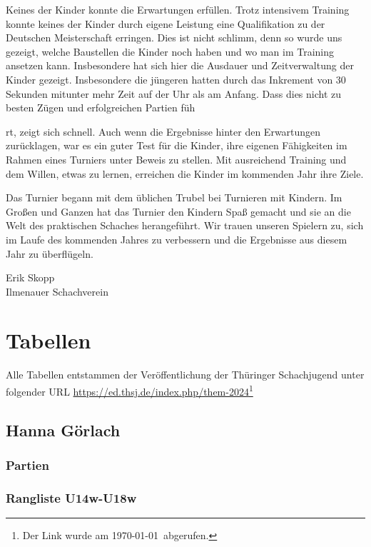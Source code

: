 \documentclass[a4paper,ngerman]{tui-algo-seminar}
\begin{document}
Keines der Kinder konnte die Erwartungen erfüllen. Trotz intensivem Training konnte keines der Kinder durch eigene Leistung eine Qualifikation zu der Deutschen Meisterschaft erringen. Dies ist nicht schlimm, denn so wurde uns gezeigt, welche Baustellen die Kinder noch haben und wo man im Training ansetzen kann. Insbesondere hat sich hier die Ausdauer und Zeitverwaltung der Kinder gezeigt. Insbesondere die jüngeren hatten durch das Inkrement von 30 Sekunden mitunter mehr Zeit auf der Uhr als am Anfang. Dass dies nicht zu besten Zügen und erfolgreichen Partien füh

rt, zeigt sich schnell. Auch wenn die Ergebnisse hinter den Erwartungen zurücklagen, war es ein guter Test für die Kinder, ihre eigenen Fähigkeiten im Rahmen eines Turniers unter Beweis zu stellen. Mit ausreichend Training und dem Willen, etwas zu lernen, erreichen die Kinder im kommenden Jahr ihre Ziele.

Das Turnier begann mit dem üblichen Trubel bei Turnieren mit Kindern. Im Großen und Ganzen hat das Turnier den Kindern Spaß gemacht und sie an die Welt des praktischen Schaches herangeführt. Wir trauen unseren Spielern zu, sich im Laufe des kommenden Jahres zu verbessern und die Ergebnisse aus diesem Jahr zu überflügeln.


\vspace{2cm}
Erik Skopp\\
Ilmenauer Schachverein\\
\clearpage


\section{Tabellen}
Alle Tabellen entstammen der Veröffentlichung der Thüringer Schachjugend unter folgender URL \url{https://ed.thsj.de/index.php/them-2024}\footnote{Der Link wurde am \today ~abgerufen.}

\subsection{Hanna Görlach}
    \subsubsection{Partien}
        
    \subsubsection{Rangliste U14w-U18w}
        
\clearpage
\end{document}
